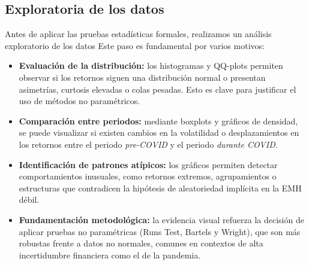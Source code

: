 \documentclass[12pt]{article}
\begin{document}
\subsection {Exploratoria de los datos}
Antes de aplicar las pruebas estadísticas formales, realizamos un análisis exploratorio de los datos Este paso es fundamental por varios motivos:
\begin{itemize}
    \item \textbf{Evaluación de la distribución:} los histogramas y QQ-plots permiten observar si los retornos siguen una distribución normal o presentan asimetrías, curtosis elevadas o colas pesadas. Esto es clave para justificar el uso de métodos no paramétricos.
    
    \item \textbf{Comparación entre periodos:} mediante boxplots y gráficos de densidad, se puede visualizar si existen cambios en la volatilidad o desplazamientos en los retornos entre el periodo \textit{pre-COVID} y el periodo \textit{durante COVID}.
    
    \item \textbf{Identificación de patrones atípicos:} los gráficos permiten detectar comportamientos inusuales, como retornos extremos, agrupamientos o estructuras que contradicen la hipótesis de aleatoriedad implícita en la EMH débil.
    
    \item \textbf{Fundamentación metodológica:} la evidencia visual refuerza la decisión de aplicar pruebas no paramétricas (Runs Test, Bartels y Wright), que son más robustas frente a datos no normales, comunes en contextos de alta incertidumbre financiera como el de la pandemia.
\end{itemize}
\end{document}
